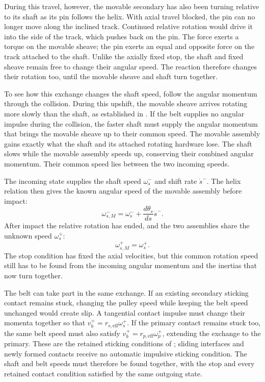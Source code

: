 \documentclass[11pt]{report}
\numberwithin{equation}{section}
\newcounter{assump}
\begin{document}
During this travel, however, the movable secondary has also been turning
relative to its shaft as its pin follows the helix. With axial travel
blocked, the pin can no longer move along the inclined track. Continued
relative rotation would drive it into the side of the track, which pushes
back on the pin. The force exerts a torque on the movable sheave; the pin
exerts an equal and opposite force on the track attached to the shaft.
Unlike the axially fixed stop, the shaft and fixed sheave remain free to
change their angular speed. The reaction therefore changes their rotation
too, until the movable sheave and shaft turn together.

To see how this exchange changes the shaft speed, follow the angular
momentum through the collision. During this upshift, the movable sheave
arrives rotating more slowly than the shaft, as established in
. If the belt supplies no
angular impulse during the collision, the faster shaft must supply the
angular momentum that brings the movable sheave up to their common speed.
The movable assembly gains exactly what the shaft and its attached
rotating hardware lose. The shaft slows while the movable assembly speeds
up, conserving their combined angular momentum. Their common speed lies
between the two incoming speeds.

The incoming state supplies the shaft speed \(\omega_s^-\) and shift
rate \(\dot s^-\). The helix relation then gives the known angular
speed of the movable assembly before impact:
\begin{equation}
    \omega_{s,M}^-
    =\omega_s^-+\frac{d\theta_s}{ds}\dot s^-.
    \label{eq:finite_event_secondary_movable_incoming_speed}
\end{equation}
After impact the relative
rotation has ended, and the two assemblies share the unknown speed
\(\omega_s^+\):
\begin{equation}
    \omega_{s,M}^+=\omega_s^+.
    \label{eq:finite_event_secondary_common_outgoing_speed}
\end{equation}
The stop condition has fixed the axial velocities, but this common
rotation speed still has to be found from the incoming angular momentum
and the inertias that now turn together.

The belt can take part in the same exchange. If an existing secondary
sticking contact remains stuck, changing the pulley speed while keeping
the belt speed unchanged would create slip. A tangential contact impulse
must change their momenta together so that
\(v_b^+=r_{s,\mathrm{eff}}\omega_s^+\). If the primary contact remains
stuck too, the same belt speed must also satisfy
\(v_b^+=r_{p,\mathrm{eff}}\omega_p^+\), extending the exchange to the
primary. These are the retained sticking conditions of
; sliding interfaces and newly
formed contacts receive no automatic impulsive sticking condition. The
shaft and belt speeds must therefore be found together, with the stop and
every retained contact condition satisfied by the same outgoing state.
\end{document}
